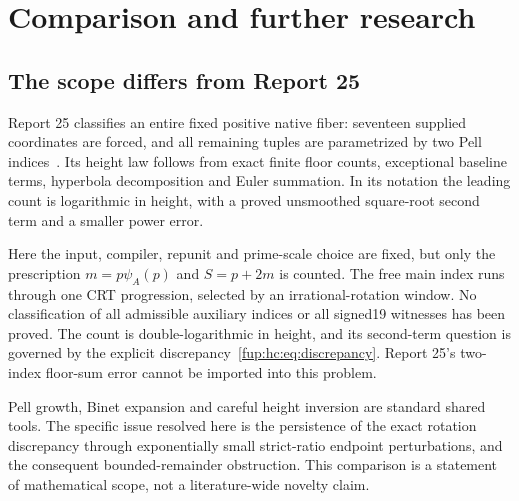 \documentclass[11pt,letterpaper]{article}
\theoremstyle{definition}\newtheorem{definition}[theorem]{Definition}
\theoremstyle{remark}\newtheorem{remark}[theorem]{Remark}
\begin{document}
\section{Comparison and further research}\label{fup:hc:sec:comparison}
\subsection{The scope differs from Report 25}
Report 25 classifies an entire fixed positive native fiber: seventeen supplied coordinates are forced, and all remaining tuples are parametrized by two Pell indices~\cite{fup:hc:r25}. Its height law follows from exact finite floor counts, exceptional baseline terms, hyperbola decomposition and Euler summation. In its notation the leading count is logarithmic in height, with a proved unsmoothed square-root second term and a smaller power error.

Here the input, compiler, repunit and prime-scale choice are fixed, but only the prescription $m=p\psi_A(p)$ and $S=p+2m$ is counted. The free main index runs through one CRT progression, selected by an irrational-rotation window. No classification of all admissible auxiliary indices or all signed19 witnesses has been proved. The count is double-logarithmic in height, and its second-term question is governed by the explicit discrepancy~\eqref{fup:hc:eq:discrepancy}. Report 25's two-index floor-sum error cannot be imported into this problem.

Pell growth, Binet expansion and careful height inversion are standard shared tools. The specific issue resolved here is the persistence of the exact rotation discrepancy through exponentially small strict-ratio endpoint perturbations, and the consequent bounded-remainder obstruction. This comparison is a statement of mathematical scope, not a literature-wide novelty claim.
\end{document}
